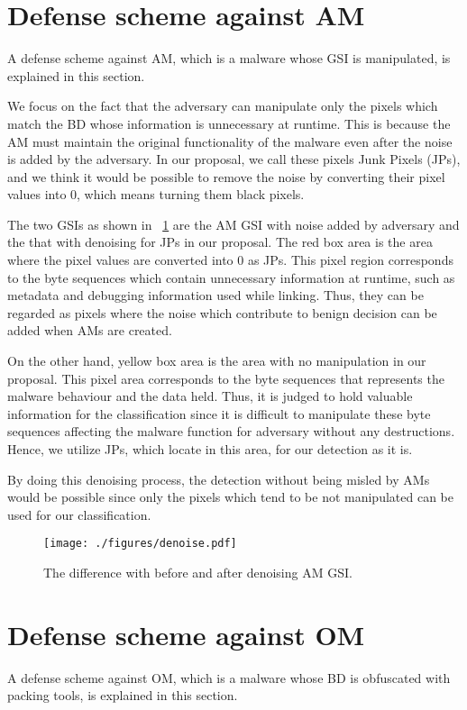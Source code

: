 \section{Defense scheme against AM}
A defense scheme against AM, which is a malware whose GSI is manipulated, is explained in this section.

We focus on the fact that the adversary can manipulate only the pixels which match the BD whose information is unnecessary at runtime.
This is because the AM must maintain the original functionality of the malware even after the noise is added by the adversary.
In our proposal, we call these pixels Junk Pixels (JPs), and we think it would be possible to remove the noise by converting their pixel values into 0, which means turning them black pixels.

The two GSIs as shown in \figurename~\ref{fig:denoise} are the AM GSI with noise added by adversary and the that with denoising for JPs in our proposal.
The red box area is the area where the pixel values are converted into 0 as JPs.
This pixel region corresponds to the byte sequences which contain unnecessary information at runtime, such as metadata and debugging information used while linking.
Thus, they can be regarded as pixels where the noise which contribute to benign decision can be added when AMs are created.

On the other hand, yellow box area is the area with no manipulation in our proposal.
This pixel area corresponds to the byte sequences that represents the malware behaviour and the data held.
Thus, it is judged to hold valuable information for the classification since it is difficult to manipulate these byte sequences affecting the malware function for adversary without any destructions.
Hence, we utilize JPs, which locate in this area, for our detection as it is.

By doing this denoising process, the detection without being misled by AMs would be possible since only the pixels which tend to be not manipulated can be used for our classification.

\begin{figure}[h]
 \centering
 \texttt{[image: ./figures/denoise.pdf]}
 \caption{The difference with before and after denoising AM GSI.} 
 \label{fig:denoise}
\end{figure}
\newpage
\section{Defense scheme against OM}
A defense scheme against OM, which is a malware whose BD is obfuscated with packing tools, is explained in this section.

